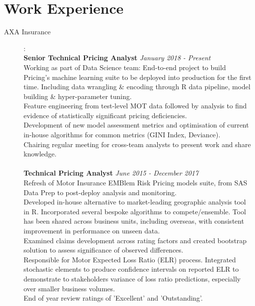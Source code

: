 \documentclass[12pt]{article}
\begin{document}
\section*{Work Experience}
\begin{description}

\item[AXA Insurance]: \\
\textbf{Senior Technical Pricing Analyst} \emph{January 2018 - Present}\\
Working as part of Data Science team: End-to-end project to build Pricing's machine learning suite to be deployed into production for the first time. Including data wrangling \& encoding through R data pipeline, model building \& hyper-parameter tuning. \\
Feature engineering from test-level MOT data followed by analysis to find evidence of statistically significant pricing deficiencies. \\
Development of new model assessment metrics and optimisation of current in-house algorithms for common metrics (GINI Index, Deviance).\\
Chairing regular meeting for cross-team analysts to present work and share knowledge.
\\\\
\textbf{Technical Pricing Analyst} \emph{June 2015 - December 2017}\\
Refresh of Motor Insurance EMBlem Risk Pricing models suite, from SAS Data Prep to post-deploy analysis and monitoring. \\
Developed in-house alternative to market-leading geographic analysis tool in R. Incorporated several bespoke algorithms to compete/ensemble. Tool has been shared across business units, including overseas, with consistent improvement in performance on unseen data. \\
Examined claims development across rating factors and created bootstrap solution to assess significance of observed differences. \\
Responsible for Motor Expected Loss Ratio (ELR) process. Integrated stochastic elements to produce confidence intervals on reported ELR to demonstrate to stakeholders variance of loss ratio predictions, especially over smaller business volumes. \\
End of year review ratings of 'Excellent' and 'Outstanding'.
\\\\\\\\



\end{description}
\end{document}

